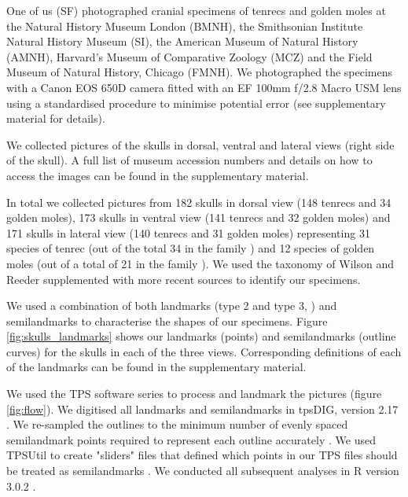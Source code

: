 \documentclass[12pt,a4paper]{article}
\begin{document}
	One of us (SF) photographed cranial specimens of tenrecs and golden moles at the Natural History Museum London (BMNH), the Smithsonian Institute Natural History Museum (SI), the American Museum of Natural History (AMNH), Harvard's Museum of Comparative Zoology (MCZ) and the Field Museum of Natural History, Chicago (FMNH). We photographed the specimens with a Canon EOS 650D camera fitted with an EF 100mm f/2.8 Macro USM lens using a standardised procedure to minimise potential error (see supplementary material for details). 

	We collected pictures of the skulls in dorsal, ventral and lateral views (right side of the skull). A full list of museum accession numbers and details on how to access the images can be found in the supplementary material.
	

	In total we collected pictures from 182 skulls in dorsal view (148 tenrecs and 34 golden moles), 173 skulls in ventral view (141 tenrecs and 32 golden moles) and 171 skulls in lateral view (140 tenrecs and 31 golden moles) representing 31 species of tenrec (out of the total 34 in the family \citep{Olson2013}) and 12 species of golden moles (out of a total of 21 in the family \citep{Asher2010}). We used the taxonomy of Wilson and Reeder \citeyearpar{Wilson2005} supplemented with more recent sources \citep{Olson2013} to identify our specimens. 
	

	We used a combination of both landmarks (type 2 and type 3, \citep{Zelditch2012}) and semilandmarks to characterise the shapes of our specimens. Figure \ref{fig:skulls_landmarks} shows our landmarks (points) and semilandmarks (outline curves) for the skulls in each of the three views. Corresponding definitions of each of the landmarks can be found in the supplementary material.
	

	We used the TPS software series \citep{SUNY2009} to process and landmark the pictures (figure \ref{fig:flow}). We digitised all landmarks and semilandmarks in tpsDIG, version 2.17 \citep{Rohlf2013}. We re-sampled the outlines to the minimum number of evenly spaced semilandmark points required to represent each outline accurately \citep[][details in supplementary material]{MacLeod2013}. We used TPSUtil \citep{Rohlf2012} to create "sliders" files that defined which points in our TPS files should be treated as semilandmarks \citep{Zelditch2012}. We conducted all subsequent analyses in R version 3.0.2 \citep[][Figure \ref{fig:flow}]{Team2014}. 
	
\end{document}
